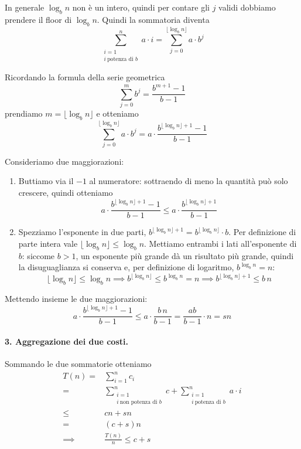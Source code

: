 In generale $\log_b n$ non è un intero, quindi per contare gli $j$ validi dobbiamo prendere il floor di $\log_b n$. Quindi la sommatoria diventa
\[
\sum_{\substack{i=1 \\ i \ \text{potenza di } b}}^n a \cdot i = \sum_{j=0}^{\lfloor \log_b n \rfloor} a \cdot b^j
\]

Ricordando la formula della serie geometrica
\[
\sum_{j=0}^m b^j = \frac{b^{m+1}-1}{b-1}
\]
prendiamo $m = \lfloor \log_b n \rfloor$ e otteniamo
\[
\sum_{j=0}^{\lfloor \log_b n \rfloor} a \cdot b^j = a \cdot \frac{b^{\lfloor \log_b n \rfloor + 1}-1}{b-1}
\]

Consideriamo  due maggiorazioni:
\begin{enumerate}
    \item Buttiamo via il $-1$ al numeratore: sottraendo di meno la quantità può solo crescere, quindi otteniamo
    \[
    a \cdot \frac{b^{\lfloor \log_b n  \rfloor + 1} - 1}{b-1} \le a \cdot \frac{b^{\lfloor \log_b n \rfloor + 1}}{b-1}
    \]
    \item Spezziamo l'esponente in due parti, $b^{\lfloor \log_b n \rfloor + 1} = b^{\lfloor \log_b n \rfloor} \cdot b$. Per definizione di parte intera vale $\lfloor \log_b n \rfloor \le \log_b n$. Mettiamo entrambi i lati all'esponente di $b$: siccome $b > 1$, un esponente più grande dà un risultato più grande, quindi la disuguaglianza si conserva e, per definizione di logaritmo, $b^{\log_b n} = n$:
    \[
    \lfloor \log_b n \rfloor \le \log_b n \implies b^{\lfloor \log_b n \rfloor} \le b^{\log_b n} = n \implies b^{\lfloor \log_b n \rfloor + 1} \le b\,n
    \]
\end{enumerate}

Mettendo insieme le due maggiorazioni:
\[
a \cdot \frac{b^{\lfloor \log_b n \rfloor + 1} -1}{b-1} \le a \cdot \frac{b\,n}{b-1} = \frac{ab}{b-1} \cdot n = sn
\]

\paragraph{3. Aggregazione dei due costi.}
Sommando le due sommatorie otteniamo
\begin{equation}
\begin{aligned}
    T(n) =& \sum_{i=1}^n c_i \\
    =& \sum_{\substack{i=1 \\ i \ \text{non potenza di } b}}^n c + \sum_{\substack{i=1 \\ i \ \text{potenza di } b}}^n a \cdot i \\
    \le& cn + sn \\
    =& (c+s)n \\
    \implies& \frac{T(n)}{n} \le c+s
\end{aligned}
\label{eq:appendice_esercizi_analisi_ammortizzata_aggregazione_costo_totale}
\end{equation}

